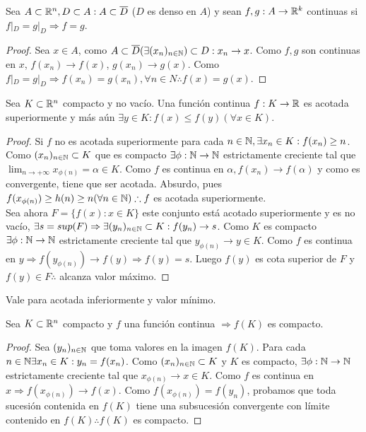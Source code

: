 \clearpage

\begin{prop}
  Sea $A \subset \mathbb{R}^n, D \subset A : A \subset \overline{D}$ ($D$ es denso en $A$) y sean $f, g : A \to \mathbb{R}^k$ continuas si $f|_D = g|_D \Rightarrow f=g$.

  \begin{proof}
    Sea $x \in A$, como $A \subset \overline{D} (\exists (x_n)_{n \in \mathbb{N}}) \subset D : x_n \to x$. Como $f, g$ son continuas en $x$, $f(x_n) \to f(x)$, $g(x_n) \to g(x)$. Como $f|_D = g|_D \Rightarrow f(x_n) = g(x_n), \forall n \in N \therefore f(x) = g(x)$.
  \end{proof}
\end{prop}

\begin{theorem}[Weiertrass]
  Sea $K \subset \mathbb{R}^n$ compacto y no vacío. Una función continua $f: K \to \mathbb{R}$ es acotada superiormente y más aún $\exists y \in K : f(x) \leq f(y) (\forall x \in K)$.
  \begin{proof}
    Si $f$ no es acotada superiormente para cada $n \in \mathbb{N}, \exists x_n \in K : f(x_n) \geq n$. Como $(x_n)_{n \in \mathbb{N}} \subset K$ que es compacto $\exists \phi: \mathbb{N} \to \mathbb{N}$ estrictamente creciente tal que $\lim_{n \to +\infty} x_{\phi(n)} = \alpha \in K$. Como $f$ es continua en $\alpha, f(x_n) \to f(\alpha)$ y como es convergente, tiene que ser acotada. Absurdo, pues $f(x_{\phi(n)}) \geq h(n) \geq n (\forall n \in \mathbb{N}) \therefore f$ es acotada superiormente. \\
    Sea ahora $F = \{ f(x) : x \in K\}$ este conjunto está acotado superiormente y es no vacío, $\exists s = sup(F) \Rightarrow \exists (y_n)_{n \in \mathbb{N}} \subset K : f(y_n) \to s$. Como $K$ es compacto $\exists \phi : \mathbb{N} \to \mathbb{N}$ estrictamente creciente tal que $y_{\phi(n)} \to y \in K$. Como $f$ es continua en $y \Rightarrow f(y_{\phi(n)}) \to f(y) \Rightarrow f(y) = s$. Luego $f(y)$ es cota superior de $F$ y $f(y) \in F \therefore$ alcanza valor máximo.
  \end{proof}
\end{theorem}

\begin{note}
  Vale para acotada inferiormente y valor mínimo.
\end{note}

\begin{theorem}
  Sea $K \subset \mathbb{R}^n$ compacto y $f$ una función continua $\Rightarrow f(K)$ es compacto.
  \begin{proof}
    Sea $(y_n)_{n \in \mathbb{N}}$ que toma valores en la imagen $f(K)$. Para cada $n \in \mathbb{N} \exists x_n \in K : y_n = f(x_n)$. Como $(x_n)_{n \in \mathbb{N}} \subset K$ y $K$ es compacto, $\exists \phi : \mathbb{N} \to \mathbb{N}$ estrictamente creciente tal que $x_{\phi(n)} \to x \in K$. Como $f$ es continua en $x \Rightarrow f(x_{\phi(n)}) \to f(x)$. Como $f(x_{\phi(n)}) = f(y_n)$, probamos que toda sucesión contenida en $f(K)$ tiene una subsucesión convergente con límite contenido en $f(K) \therefore f(K)$ es compacto.
  \end{proof}
\end{theorem}

